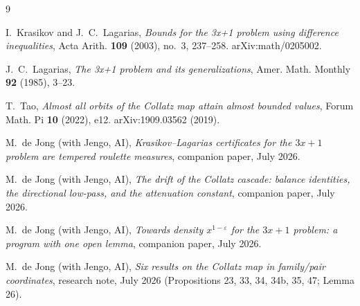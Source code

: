 \documentclass[11pt]{article}
\theoremstyle{definition}
\theoremstyle{remark}
\begin{document}
\begin{thebibliography}{9}

I.~Krasikov and J.~C.~Lagarias,
\emph{Bounds for the 3x+1 problem using difference inequalities},
Acta Arith. \textbf{109} (2003), no.~3, 237--258. arXiv:math/0205002.

J.~C.~Lagarias,
\emph{The 3x+1 problem and its generalizations},
Amer. Math. Monthly \textbf{92} (1985), 3--23.

T.~Tao,
\emph{Almost all orbits of the Collatz map attain almost bounded values},
Forum Math. Pi \textbf{10} (2022), e12. arXiv:1909.03562 (2019).

M.~de Jong (with Jengo, AI),
\emph{Krasikov--Lagarias certificates for the $3x+1$ problem are tempered
roulette measures}, companion paper, July 2026.

M.~de Jong (with Jengo, AI),
\emph{The drift of the Collatz cascade: balance identities, the directional
low-pass, and the attenuation constant}, companion paper, July 2026.

M.~de Jong (with Jengo, AI),
\emph{Towards density $x^{1-\varepsilon}$ for the $3x+1$ problem: a program
with one open lemma}, companion paper, July 2026.

M.~de Jong (with Jengo, AI),
\emph{Six results on the Collatz map in family/pair coordinates}, research
note, July 2026 (Propositions 23, 33, 34, 34b, 35, 47; Lemma 26).

\end{thebibliography}
\end{document}
